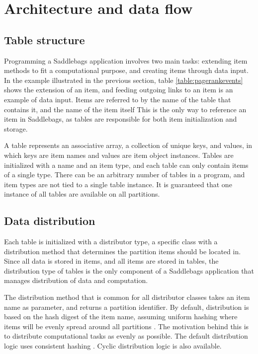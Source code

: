 \documentclass{uit-report}
\begin{document}
\section{Architecture and data flow}
\subsection{Table structure}
Programming a Saddlebags application involves two main tasks: extending item methods to fit a computational purpose, and creating items through data input. In the example illustrated in the previous section, table \ref{table:pagerankevents} shows the extension of an item, and feeding outgoing links to an item is an example of data input. Items are referred to by the name of the table that contains it, and the name of the item itself This is the only way to reference an item in Saddlebags, as tables are responsible for both item initialization and storage.

A table represents an associative array, a collection of unique keys, and values, in which keys are item names and values are item object instances.  Tables are initialized with a name and an item type, and each table can only contain items of a single type. There can be an arbitrary number of tables in a program, and item types are not tied to a single table instance. It is guaranteed that one instance of all tables are available on all partitions.




\subsection{Data distribution}
Each table is initialized with a distributor type, a specific class with a distribution method that determines the partition items should be located in. Since all data is stored in items, and all items are stored in tables, the distribution type of tables is the only component of a Saddlebags application that manages distribution of data and computation.

The distribution method that is common for all distributor classes takes an item name as parameter, and returns a partition identifier. By default, distribution is based on the hash digest of the item name, assuming uniform hashing where items will be evenly spread around all partitions \cite{uniform_hashing}. The motivation behind this is to distribute computational tasks as evenly as possible. The default distribution logic uses consistent hashing \cite{consistent_hashing}. Cyclic distribution logic is also available. 
\end{document}
